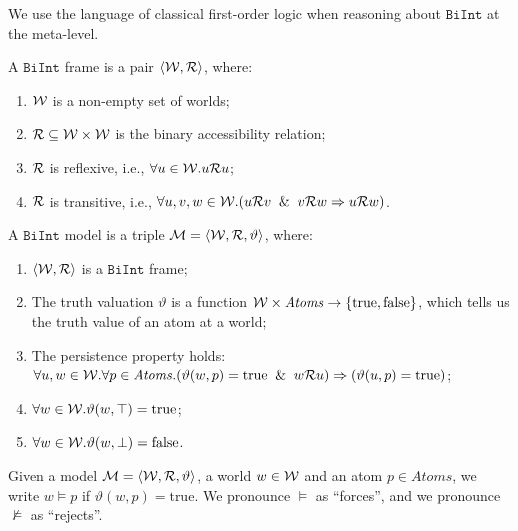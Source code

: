 \documentclass{llncs}
\numberwithin{equation}{section}
\newcommand{\pair}[2]{\langle #1, #2\rangle}
\newcommand{\Lg}[1]{\mathtt{#1}}
\newcommand{\Atoms}{\mathit{Atoms}}
\newcommand{\Force}{\vDash}
\newcommand{\NotForce}{\nvDash}
\newcommand{\MetaImp}{\Rightarrow}
\newcommand{\Bottom}{\perp}
\newcommand{\Top}{\top}
\newcommand{\mycal}[1]{
        {\cal{#1}}
}
\newcommand{\Model}{
        \mycal{M}=\langle \mycal{W}, \mycal{R}, \vartheta \rangle
}
\newcommand {\BiInt}{
        \Lg{BiInt}
}
\newcommand{\true}{\mbox{true}}
\newcommand{\false}{\mbox{false}}
\begin{document}
We use the language of classical first-order logic when reasoning about $\BiInt$ at the meta-level.

\begin{definition}[Frame]
A $\BiInt$ frame is a pair $\pair{\mycal{W}}{\mycal{R}}$, where:
	\begin{enumerate}
		\item $\mycal{W}$ is a non-empty set of worlds;
		\item $\mycal{R} \subseteq \mycal{W} \times \mycal{W}$ is the binary accessibility relation;
		\item $\mycal{R}$ is reflexive, i.e.,  $\forall u \in \mycal{W} . u \mycal{R} u$;
		\item $\mycal{R}$ is transitive, i.e.,  $\forall u, v, w \in \mycal{W} . (u \mycal{R} v \And v \mycal{R} w \MetaImp u \mycal{R} w)$.
	\end{enumerate}
\end{definition}

\begin{definition}[Model]\label{model}
A $\BiInt$ model is a triple $\Model$, where:
	\begin{enumerate}
		\item $\pair{\mycal{W}}{\mycal{R}}$ is a $\BiInt$ frame;
		\item The truth valuation $\vartheta$ is a function $\mycal{W} \times \Atoms \rightarrow \{ \true, \false \}$, which tells us the truth value of an atom at a world;
		\item The persistence property holds: \\
			$\forall u,w \in \mycal{W} . \forall p \in \Atoms . (\vartheta(w,p) = \true \And w \mycal{R} u) \MetaImp (\vartheta(u,p) = \true)$;
		\item\label{top} $\forall w \in \mycal{W}. \vartheta(w,\Top) = \true$;
		\item\label{bottom} $\forall w \in \mycal{W}. \vartheta(w,\Bottom) = \false$.
	\end{enumerate}
\end{definition}

\begin{definition}
Given a model $\Model$, a world $w \in \mycal{W}$ and an atom $p \in \Atoms$, we write $w \Force p$ if $\vartheta(w,p) = \true$.
We pronounce $\Force$ as ``forces'', and we pronounce $\NotForce$ as ``rejects''.
\end{definition}
\end{document}
